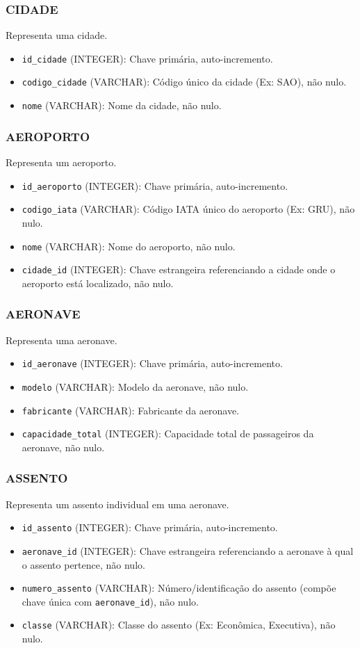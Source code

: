 \subsubsection*{CIDADE}
Representa uma cidade.
\begin{itemize}
    \item \texttt{id\_cidade} (INTEGER): Chave primária, auto-incremento.
    \item \texttt{codigo\_cidade} (VARCHAR): Código único da cidade (Ex: SAO), não nulo.
    \item \texttt{nome} (VARCHAR): Nome da cidade, não nulo.
\end{itemize}

\subsubsection*{AEROPORTO}
Representa um aeroporto.
\begin{itemize}
    \item \texttt{id\_aeroporto} (INTEGER): Chave primária, auto-incremento.
    \item \texttt{codigo\_iata} (VARCHAR): Código IATA único do aeroporto (Ex: GRU), não nulo.
    \item \texttt{nome} (VARCHAR): Nome do aeroporto, não nulo.
    \item \texttt{cidade\_id} (INTEGER): Chave estrangeira referenciando a cidade onde o aeroporto está localizado, não nulo.
\end{itemize}

\subsubsection*{AERONAVE}
Representa uma aeronave.
\begin{itemize}
    \item \texttt{id\_aeronave} (INTEGER): Chave primária, auto-incremento.
    \item \texttt{modelo} (VARCHAR): Modelo da aeronave, não nulo.
    \item \texttt{fabricante} (VARCHAR): Fabricante da aeronave.
    \item \texttt{capacidade\_total} (INTEGER): Capacidade total de passageiros da aeronave, não nulo.
\end{itemize}

\subsubsection*{ASSENTO}
Representa um assento individual em uma aeronave.
\begin{itemize}
    \item \texttt{id\_assento} (INTEGER): Chave primária, auto-incremento.
    \item \texttt{aeronave\_id} (INTEGER): Chave estrangeira referenciando a aeronave à qual o assento pertence, não nulo.
    \item \texttt{numero\_assento} (VARCHAR): Número/identificação do assento (compõe chave única com \texttt{aeronave\_id}), não nulo.
    \item \texttt{classe} (VARCHAR): Classe do assento (Ex: Econômica, Executiva), não nulo.
\end{itemize}

